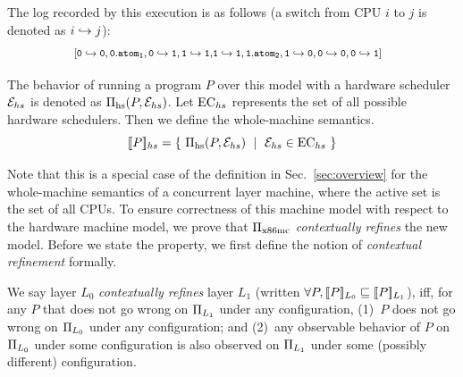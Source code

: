 \noindent
The log recorded by this execution is as follows
(a switch from CPU $i$ to $j$ is denoted as $i\switch j$):\vspace{-5pt}
\[
\begin{footnotesize}
\begin{array}{l}
\!\!\!\!\![\event{0\switch 0, 0.atom_1,  0\switch 1, 1\switch 1,}
\event{1\switch 1, 1.atom_2, 1\switch 0, 0\switch 0,  0\switch 1}]
\end{array}
\end{footnotesize}
\vspace{-5pt}
\]

The behavior of running a program $P$
over this model with a hardware scheduler $\hardoracle$
is denoted as $\mach{hs}(P,\hardoracle)$.
Let $\ectxtc_{hs}$ represents the set of all possible hardware
schedulers. Then we define the whole-machine semantics.
{\small \[
\sem{hs}{P} = \{ ~ \mach{hs}(P,\hardoracle) ~ \mid ~ \hardoracle \in \ectxtc_{hs} ~ \}
\vspace{-15pt}
\]}


\noindent
Note that this is a special case of the definition in Sec.~\ref{sec:overview}
for the whole-machine semantics of a concurrent layer machine, where the 
active set is the set of all CPUs.
To ensure correctness of this machine model with respect to the hardware machine model,
we prove that $\mach{x86mc}$ \emph{contextually refines} the new model.
Before we state the property, we first define the notion of
\emph{contextual refinement} formally.

\begin{definition}
\label{def:mach:refine}
We say layer $L_0$ 
\emph{contextually refines}
layer $L_1$ (written $\forall P, \sem{L_0}{P}\machrel \sem{L_1}{P}$),
iff, for any $P$ that 
does not go wrong 
on $\machx_{L_1}$ under any configuration, (1)~$P$ does not go wrong on $\machx_{L_0}$
under any configuration;
and (2)~any observable behavior of $P$ on $\machx_{L_0}$
under some configuration is also observed on $\machx_{L_1}$
under some (possibly different) configuration.
\end{definition}

